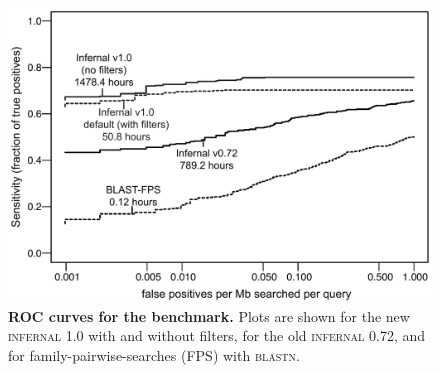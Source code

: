 \newpage
\begin{figure}
\begin{center}
\includegraphics[width=6.4in]{figs/roc}
\caption{\textbf{ROC curves for the benchmark.}  Plots are shown for
the new \textsc{infernal} 1.0 with and without filters, for the old 
\textsc{infernal} 0.72, and for
family-pairwise-searches (FPS) with \textsc{blastn}.}
\label{fig:roc}
\end{center}
\end{figure}
